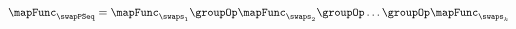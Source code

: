 \begin{equation}
    \centering
    \label{equ:parswaps}
    \begin{aligned}
        \mapFunc_{\swapPSeq} = \mapFunc_{\swaps_1} \groupOp \mapFunc_{\swaps_2} 
        \groupOp \ldots \groupOp\mapFunc_{\swaps_k}
    \end{aligned}
\end{equation}
